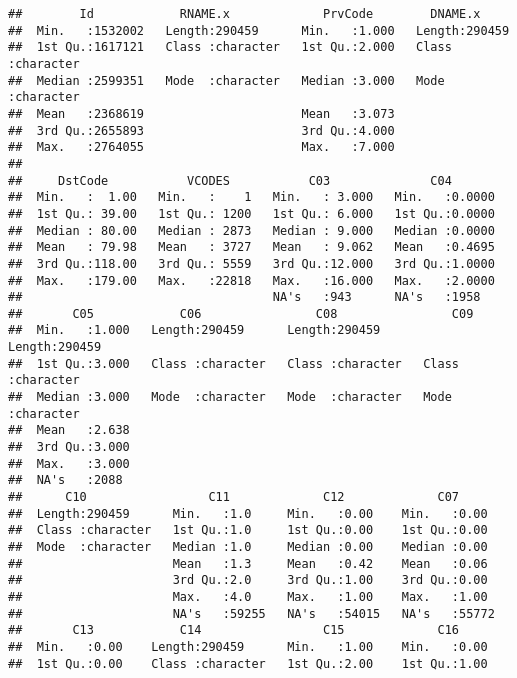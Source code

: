 \documentclass[
]{article}
\begin{document}
\begin{verbatim}
##        Id            RNAME.x             PrvCode        DNAME.x         
##  Min.   :1532002   Length:290459      Min.   :1.000   Length:290459     
##  1st Qu.:1617121   Class :character   1st Qu.:2.000   Class :character  
##  Median :2599351   Mode  :character   Median :3.000   Mode  :character  
##  Mean   :2368619                      Mean   :3.073                     
##  3rd Qu.:2655893                      3rd Qu.:4.000                     
##  Max.   :2764055                      Max.   :7.000                     
##                                                                         
##     DstCode           VCODES           C03              C04        
##  Min.   :  1.00   Min.   :    1   Min.   : 3.000   Min.   :0.0000  
##  1st Qu.: 39.00   1st Qu.: 1200   1st Qu.: 6.000   1st Qu.:0.0000  
##  Median : 80.00   Median : 2873   Median : 9.000   Median :0.0000  
##  Mean   : 79.98   Mean   : 3727   Mean   : 9.062   Mean   :0.4695  
##  3rd Qu.:118.00   3rd Qu.: 5559   3rd Qu.:12.000   3rd Qu.:1.0000  
##  Max.   :179.00   Max.   :22818   Max.   :16.000   Max.   :2.0000  
##                                   NA's   :943      NA's   :1958    
##       C05            C06                C08                C09           
##  Min.   :1.000   Length:290459      Length:290459      Length:290459     
##  1st Qu.:3.000   Class :character   Class :character   Class :character  
##  Median :3.000   Mode  :character   Mode  :character   Mode  :character  
##  Mean   :2.638                                                           
##  3rd Qu.:3.000                                                           
##  Max.   :3.000                                                           
##  NA's   :2088                                                            
##      C10                 C11             C12             C07       
##  Length:290459      Min.   :1.0     Min.   :0.00    Min.   :0.00   
##  Class :character   1st Qu.:1.0     1st Qu.:0.00    1st Qu.:0.00   
##  Mode  :character   Median :1.0     Median :0.00    Median :0.00   
##                     Mean   :1.3     Mean   :0.42    Mean   :0.06   
##                     3rd Qu.:2.0     3rd Qu.:1.00    3rd Qu.:0.00   
##                     Max.   :4.0     Max.   :1.00    Max.   :1.00   
##                     NA's   :59255   NA's   :54015   NA's   :55772  
##       C13            C14                 C15             C16        
##  Min.   :0.00    Length:290459      Min.   :1.00    Min.   :0.00    
##  1st Qu.:0.00    Class :character   1st Qu.:2.00    1st Qu.:1.00    

\end{verbatim}
\end{document}
